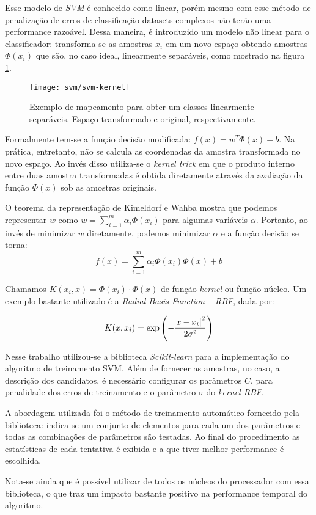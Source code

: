 Esse modelo de \textit{SVM} é conhecido como linear, porém mesmo com esse método de penalização de erros de classificação datasets complexos não terão uma performance razoável. Dessa maneira, é introduzido um modelo não linear para o classificador: transforma-se as amostras $x_i$ em um novo espaço obtendo amostras $\Phi(x_i)$ que são, no caso ideal, linearmente separáveis, como mostrado na figura \ref{fig:svm-kernel}.

\begin{figure}[h]
\caption{Exemplo de mapeamento para obter um classes linearmente separáveis. Espaço transformado e original, respectivamente.}
\centering
\texttt{[image: svm/svm-kernel]}
\label{fig:svm-kernel}
\end{figure}

Formalmente tem-se a função decisão modificada: $f(x)=w^T \Phi(x) +b$.  Na prática, entretanto, não se calcula as coordenadas da amostra transformada no novo espaço. Ao invés disso utiliza-se o \textit{kernel trick} em que o produto interno entre duas amostra transformadas é obtida diretamente através da avaliação da função $\Phi(x)$ sob as amostras originais.

O teorema da representação de Kimeldorf e Wahba mostra que podemos representar $w$ como $w=\sum_{i=1}^m \alpha_i \Phi(x_i)$ para algumas variáveis $\alpha$. Portanto, ao invés de minimizar $w$ diretamente, podemos minimizar $\alpha$ e a função decisão se torna: 
\begin{equation}
	\label{eq:svm-decision-func}
	f(x)=\sum_{i=1}^m \alpha_i \Phi(x_i) \Phi(x) +b
\end{equation}

Chamamos $K(x_i, x) = \Phi(x_i) \cdot \Phi(x)$ de função \textit{kernel} ou função núcleo. Um exemplo bastante utilizado é a \textit{Radial Basis Function -- RBF}, dada por: 

\begin{equation}
	\label{eq:svm-kernel-func}
	K(x,x_i) = \exp\left(-\frac{\abs{x-x_i}^2}{2\sigma^2}\right)
\end{equation}

Nesse trabalho utilizou-se a biblioteca \textit{Scikit-learn} para a implementação do algoritmo de treinamento SVM. Além de fornecer as amostras, no caso, a descrição dos candidatos, é necessário configurar os parâmetros $C$, para penalidade dos erros de treinamento e o parâmetro $\sigma$ do \textit{kernel RBF}. 

A abordagem utilizada foi o método de treinamento automático fornecido pela biblioteca: indica-se um conjunto de elementos para cada um dos parâmetros e todas as combinações de parâmetros são testadas. Ao final do procedimento as estatísticas de cada tentativa é exibida e a que tiver melhor performance é escolhida.

Nota-se ainda que é possível utilizar de todos os núcleos do processador com essa biblioteca, o que traz um impacto bastante positivo na performance temporal do algoritmo.


